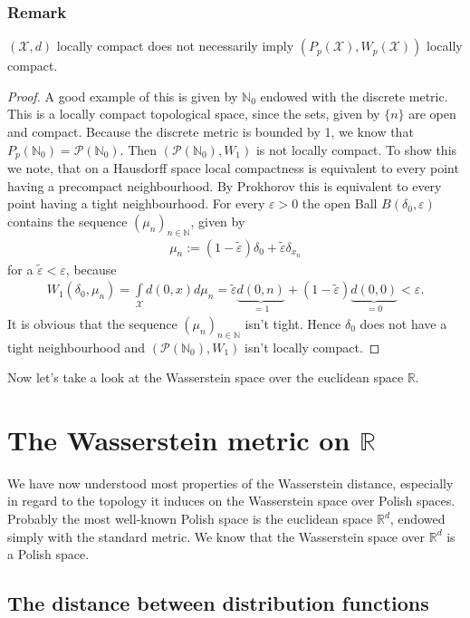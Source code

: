 \documentclass[11pt,a4paper]{article}
\begin{document}
\subsubsection{Remark}
$(\mathcal{X},d)$ locally compact does not necessarily imply $(P_p(\mathcal{X}),W_p(\mathcal{X}))$ locally compact.
\begin{proof}
A good example of this is given by $\mathbb{N}_0$ endowed with the discrete metric. This is a locally compact topological space, since the sets, given by $\lbrace{}n\rbrace$ are open and compact. Because the discrete metric is bounded by 1, we know that $P_p(\mathbb{N}_0)=\mathcal{P}(\mathbb{N}_0).$ Then $(\mathcal{P}(\mathbb{N}_0),W_1)$ is not locally compact. To show this we note, that on a Hausdorff space local compactness is equivalent to every point having a precompact neighbourhood. By Prokhorov this is equivalent to every point having a tight neighbourhood. For every $\varepsilon>0$ the open Ball $B(\delta_0,\varepsilon)$ contains the sequence $(\mu_n)_{n\in\mathbb{N}}$, given by
\begin{align*}
\mu_n:=(1-\tilde{\varepsilon})\delta_0 + \tilde{\varepsilon}\delta_{x_n}
\end{align*} 
for a $\tilde{\varepsilon}<\varepsilon$, because
\begin{align*}
W_1(\delta_0,\mu_n) = \int\limits_{\mathcal{X}}d(0,x)d\mu_n = \tilde{\varepsilon}\underbrace{d(0,n)}_{=1}+(1-\tilde{\varepsilon})\underbrace{d(0,0)}_{=0}<\varepsilon.
\end{align*}
It is obvious that the sequence $(\mu_n)_{n\in\mathbb{N}}$ isn't tight. Hence $\delta_0$ does not have a tight neighbourhood and $(\mathcal{P}(\mathbb{N}_0),W_1)$ isn't locally compact.
\end{proof}
\noindent{}Now let's take a look at the Wasserstein space over the euclidean space $\mathbb{R}$.
\section{The Wasserstein metric on $\mathbb{R}$}
We have now understood most properties of the Wasserstein distance, especially in regard to the topology it induces on the Wasserstein space over Polish spaces. Probably the most well-known Polish space is the euclidean space $\mathbb{R}^d$, endowed simply with the standard metric. We know that the Wasserstein space over $\mathbb{R}^d$ is a Polish space. 
\subsection{The distance between distribution functions}
\end{document}
